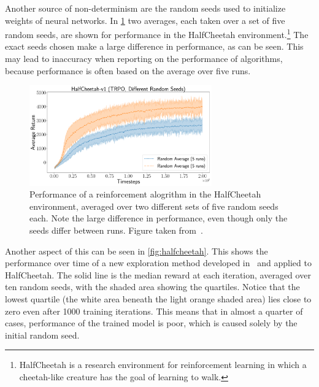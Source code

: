 \documentclass[11pt, a4paper]{report} %
\begin{document}
Another source of non-determinism are the random seeds used to initialize weights of neural networks.
In \cref{fig:halfcheetahdifferentresults} two averages, each taken over a set of five random seeds, are shown for performance in the HalfCheetah environment.\footnote{HalfCheetah is a research environment for reinforcement learning in which a cheetah-like creature has the goal of learning to walk.}
The exact seeds chosen make a large difference in performance, as can be seen.
This may lead to inaccuracy when reporting on the performance of algorithms, because performance is often based on the average over five runs.

\begin{figure}[tb!]
  \centering
  \includegraphics[width=0.7\textwidth]{HalfCheetah-v1__TRPO,_Different_Random_Seeds_.pdf}
  \caption{Performance of a reinforcement alogrithm in the HalfCheetah environment, averaged over two different sets of five random seeds each. Note the large difference in performance, even though only the seeds differ between runs. Figure taken from~\cite{1709.06560}.}
  \label{fig:halfcheetahdifferentresults}
\end{figure}


Another aspect of this can be seen in \cref{fig:halfcheetah}.
This shows the performance over time of a new exploration method developed in~\cite{houthooft16_vime} and applied to HalfCheetah.
The solid line is the median reward at each iteration, averaged over ten random seeds, with the shaded area showing the quartiles.
Notice that the lowest quartile (the white area beneath the light orange shaded area) lies close to zero even after 1000 training iterations.
This means that in almost a quarter of cases, performance of the trained model is poor, which is caused solely by the initial random seed.
\end{document}
